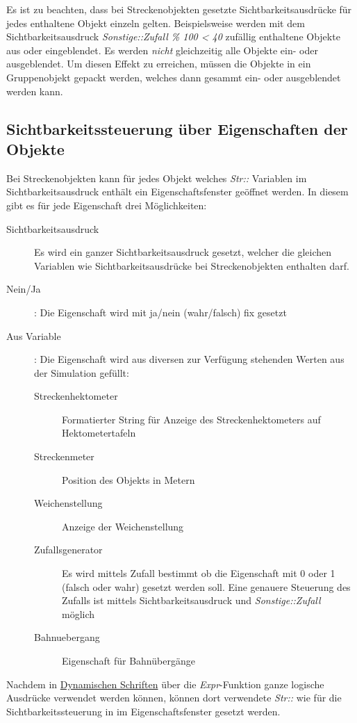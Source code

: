 Es ist zu beachten, dass bei Streckenobjekten gesetzte Sichtbarkeitsausdrücke für jedes enthaltene Objekt einzeln gelten. Beispielsweise werden mit dem Sichtbarkeitsausdruck \emph{Sonstige::Zufall \% 100 < 40} zufällig enthaltene Objekte aus oder eingeblendet. Es werden \emph{nicht} gleichzeitig alle Objekte ein- oder ausgeblendet. Um diesen Effekt zu erreichen, müssen die Objekte in ein Gruppenobjekt gepackt werden, welches dann gesammt ein- oder ausgeblendet werden kann.

\subsection{Sichtbarkeitssteuerung über Eigenschaften der Objekte}
\label{sec:editor-obj-sichtbarkeitssteuerung-streig}
Bei Streckenobjekten kann für jedes Objekt welches \emph{Str::} Variablen im Sichtbarkeitsausdruck enthält ein Eigenschaftsfenster geöffnet werden. In diesem gibt es für jede Eigenschaft drei Möglichkeiten:
\begin{description}
\item[Sichtbarkeitsausdruck]Es wird ein ganzer Sichtbarkeitsausdruck gesetzt, welcher die gleichen Variablen wie Sichtbarkeitsausdrücke bei Streckenobjekten enthalten darf.
\item[Nein/Ja]: Die Eigenschaft wird mit ja/nein (wahr/falsch) fix gesetzt
\item[Aus Variable]: Die Eigenschaft wird aus diversen zur Verfügung stehenden Werten aus der Simulation gefüllt:
\begin{description}
\item[Streckenhektometer] Formatierter String für Anzeige des Streckenhektometers auf Hektometertafeln
\item[Streckenmeter] Position des Objekts in Metern
\item[Weichenstellung] Anzeige der Weichenstellung
\item[Zufallsgenerator] Es wird mittels Zufall bestimmt ob die Eigenschaft mit 0 oder 1 (falsch oder wahr) gesetzt werden soll. Eine genauere Steuerung des Zufalls ist mittels Sichtbarkeitsausdruck und \emph{Sonstige::Zufall} möglich
\item[Bahnuebergang] Eigenschaft für Bahnübergänge
\end{description}
\end{description}

Nachdem in \hyperref[sec:editor-obj-dynstr]{Dynamischen Schriften} über die \emph{Expr}-Funktion ganze logische Ausdrücke verwendet werden können, können dort verwendete \emph{Str::} wie für die Sichtbarkeitssteuerung in im Eigenschaftsfenster gesetzt werden.